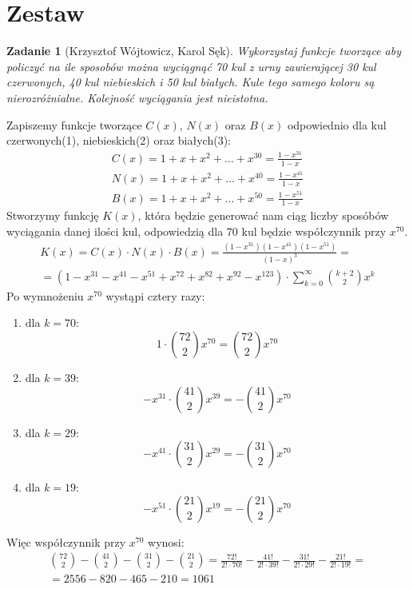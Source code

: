 \documentclass{mwart}
\newtheorem{zad}{Zadanie}[section]
\begin{document}
\newpage
\section{Zestaw}          %

\begin{zad}[Krzysztof Wójtowicz, Karol Sęk]
    Wykorzystaj funkcje tworzące aby policzyć na ile sposobów można wyciągnąć 70 kul z urny zawierającej 30 kul czerwonych, 40 kul niebieskich i 50 kul białych. Kule tego samego koloru są nierozróżnialne. Kolejność wyciągania jest nieistotna.
\end{zad}
\begin{mdframed}
    Zapiszemy funkcje tworzące $C(x)$, $N(x)$ oraz $B(x)$ odpowiednio dla kul czerwonych(1), niebieskich(2) oraz białych(3):
    \begin{align}
        C(x) = 1 + x + x^2 + \dots + x^{30} = \frac{1 - x^{31}}{1 - x} \\
        N(x) = 1 + x + x^2 + \dots + x^{40} = \frac{1 - x^{41}}{1 - x} \\
        B(x) = 1 + x + x^2 + \dots + x^{50} = \frac{1 - x^{51}}{1 - x}
    \end{align}
    Stworzymy funkcję $K(x)$, która będzie generować nam ciąg liczby sposóbów wyciągania danej ilości kul, odpowiedzią dla 70 kul będzie współczynnik przy $x^{70}$.
    \begin{gather*}
        K(x) = C(x) \cdot N(x) \cdot B(x) = \frac{(1 - x^{31})(1 - x^{41})(1 - x^{51})}{(1 - x)^3} = \\
        = (1 - x^{31} - x^{41} - x^{51} + x^{72} + x^{82} + x^{92} - x^{123}) \cdot \sum_{k=0}^{\infty} \binom{k+2}{2}x^k
    \end{gather*}
    Po wymnożeniu $x^{70}$ wystąpi cztery razy:
    \begin{enumerate}
        \item dla $k = 70$: \[ 1 \cdot \binom{72}{2}x^{70} = \binom{72}{2}x^{70}\]
        \item dla $k = 39$: \[ -x^{31} \cdot \binom{41}{2}x^{39} = -\binom{41}{2}x^{70}\]
        \item dla $k = 29$: \[ -x^{41} \cdot \binom{31}{2}x^{29} = -\binom{31}{2}x^{70}\]
        \item dla $k = 19$: \[ -x^{51} \cdot \binom{21}{2}x^{19} = -\binom{21}{2}x^{70}\]
    \end{enumerate}
    Więc współczynnik przy $x^{70}$ wynosi:
    \begin{gather*}
        \binom{72}{2} - \binom{41}{2} - \binom{31}{2} - \binom{21}{2} = \frac{72!}{2! \cdot 70!} - \frac{41!}{2! \cdot 39!} - \frac{31!}{2! \cdot 29!} - \frac{21!}{2! \cdot 19!} = \\ = 2556 - 820 - 465 - 210 = 1061
    \end{gather*}

\end{mdframed}
\end{document}

